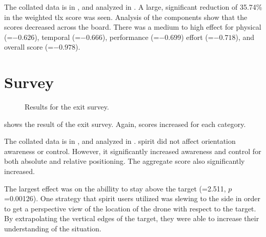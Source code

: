   The collated data is in , and analyzed in .
  A large, significant reduction of 35.74\% in the weighted \gls{tlx} score was seen.
  Analysis of the components show that the scores decreased across the board.
  There was a medium to high effect for physical (=$-0.626$), temporal (=$-0.666$), performance (=$-0.699$) effort (=$-0.718$), and overall score (=$-0.978$).

  \section{Survey}
  \begin{figure}[h]
    \centering
    
    \caption[Survey results]{Results for the exit survey.}
    \label{fig:survey}
  \end{figure}

   shows the result of the exit survey.
  Again, scores increased for each category.

  The collated data is in , and analyzed in .
  \gls{spirit} did not affect orientation awareness or control.
  However, it significantly increased awareness and control for both absolute and relative positioning.
  The aggregate score also significantly increased.

  The largest effect was on the abillity to stay above the target (=2.511, $p$=0.00126).
  One strategy that \gls{spirit} users utilized was slewing to the side in order to get a perspective view of the location of the drone with respect to the target.
  By extrapolating the vertical edges of the target, they were able to increase their understanding of the situation.

